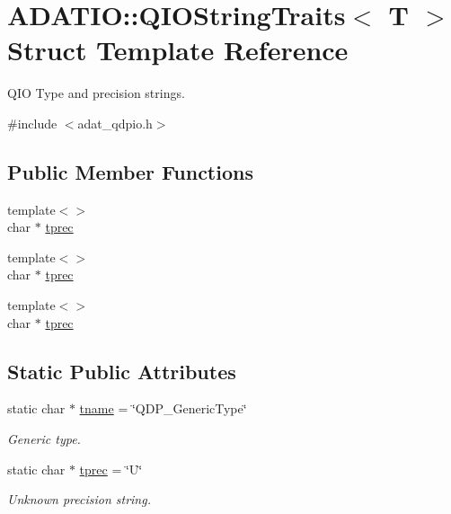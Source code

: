 \hypertarget{structADATIO_1_1QIOStringTraits}{}\section{A\+D\+A\+T\+IO\+:\+:Q\+I\+O\+String\+Traits$<$ T $>$ Struct Template Reference}
\label{structADATIO_1_1QIOStringTraits}


Q\+IO Type and precision strings.  




{\ttfamily \#include $<$adat\+\_\+qdpio.\+h$>$}

\subsection*{Public Member Functions}
\begin{DoxyCompactItemize}
\item 
{\footnotesize template$<$$>$ }\\char $\ast$ \mbox{\hyperlink{structADATIO_1_1QIOStringTraits_ad88615f93dbc104e55a88d6d166c86dc}{tprec}}
\item 
{\footnotesize template$<$$>$ }\\char $\ast$ \mbox{\hyperlink{structADATIO_1_1QIOStringTraits_a749439e4e624293716faa242eb63bc7c}{tprec}}
\item 
{\footnotesize template$<$$>$ }\\char $\ast$ \mbox{\hyperlink{structADATIO_1_1QIOStringTraits_ac52b79fcc02bc184bbc1fb50b7dbf30c}{tprec}}
\end{DoxyCompactItemize}
\subsection*{Static Public Attributes}
\begin{DoxyCompactItemize}
\item 
static char $\ast$ \mbox{\hyperlink{group__qio_ga14189398447447c3ff6d039d05033619}{tname}} = \char`\"{}Q\+D\+P\+\_\+\+Generic\+Type\char`\"{}
\begin{DoxyCompactList}\small\item\em Generic type. \end{DoxyCompactList}\item 
static char $\ast$ \mbox{\hyperlink{group__qio_ga94d948248c229ef3f2935069425f550a}{tprec}} = \char`\"{}U\char`\"{}
\begin{DoxyCompactList}\small\item\em Unknown precision string. \end{DoxyCompactList}\end{DoxyCompactItemize}


